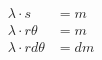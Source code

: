 \documentclass[12pt]{article}
\begin{document}
\begin{align*}
\lambda \cdot s &= m \\
\lambda \cdot r \theta &= m \\
\lambda \cdot r d\theta &= dm \\
\end{align*}
\end{document}
